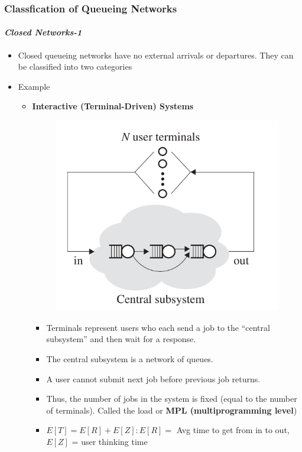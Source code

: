 \documentclass{beamer}
\begin{document}
\begin{frame}
    \frametitle{Classfication of Queueing Networks}
    \framesubtitle{\textbf{\textit{Closed Networks-1}}}
	\begin{itemize}
		\item Closed queueing networks have no external arrivals or departures. 			They can be classified into two categories
		\item Example
			\begin{itemize}
			\item \textbf{Interactive (Terminal-Driven) Systems}
				\begin{figure}
        		\begin{center}
		            \includegraphics[scale=0.2]{images/closed_networks_1.jpeg}
        		\end{center}
		    \end{figure}
		    \begin{itemize}
		    \item Terminals represent users who each send a job to the “central subsystem” and then wait for a response. 
		    \item The central subsystem is a network of queues. 
		    \item A user cannot submit  next job before  previous job returns.
		    \item  Thus, the number of jobs in the system is
			fixed (equal to the number of terminals). Called the load or
				\textbf{MPL (multiprogramming level})
			\item $E [T ] = E [R] + E [Z] : E[R] =$ Avg time to get from in to out, $E[Z]$ = user thinking time 

		    \end{itemize}
		  
			\end{itemize}
		  
	\end{itemize}	    
    
\end{frame}
\end{document}
